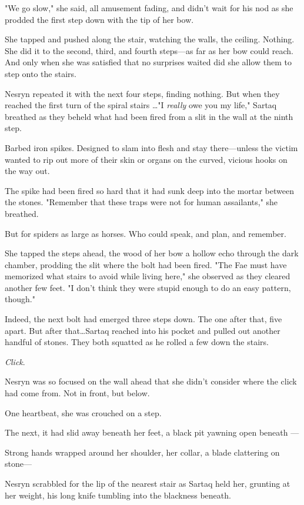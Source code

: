 "We go slow," she said, all amusement fading, and didn't wait for his nod as she prodded the first step down with the tip of her bow.

She tapped and pushed along the stair, watching the walls, the ceiling.
Nothing.
She did it to the second, third, and fourth steps---as far as her bow could reach.
And only when she was satisfied that no surprises waited did she allow them to step onto the stairs.

Nesryn repeated it with the next four steps, finding nothing.
But when they reached the first turn of the spiral stairs \ldots"I \emph{really}
owe you my life," Sartaq breathed as they beheld what had been fired from a slit in the wall at the ninth step.

Barbed iron spikes.
Designed to slam into flesh and stay there---unless the victim wanted to rip out more of their skin or organs on the curved, vicious hooks on the way out.

The spike had been fired so hard that it had sunk deep into the mortar between the stones.
"Remember that these traps were not for human assailants," she breathed.

But for spiders as large as horses.
Who could speak, and plan, and remember.

She tapped the steps ahead, the wood of her bow a hollow echo through the dark chamber, prodding the slit where the bolt had been fired.
"The Fae must have memorized what stairs to avoid while living here," she observed as they cleared another few feet.
"I don't think they were stupid enough to do an easy pattern, though."

Indeed, the next bolt had emerged three steps down.
The one after that, five apart.
But after that\ldots Sartaq reached into his pocket and pulled out another handful of stones.
They both squatted as he rolled a few down the stairs.

\emph{Click}.

Nesryn was so focused on the wall ahead that she didn't consider where the click had come from.
Not in front, but below.

One heartbeat, she was crouched on a step.

The next, it had slid away beneath her feet, a black pit yawning open beneath ---

Strong hands wrapped around her shoulder, her collar, a blade clattering on stone---

Nesryn scrabbled for the lip of the nearest stair as Sartaq held her, grunting at her weight, his long knife tumbling into the blackness beneath.


